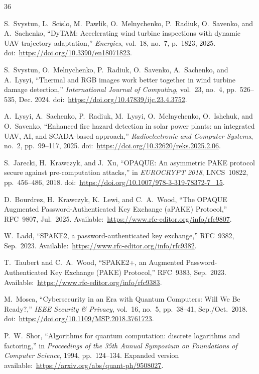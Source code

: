 \documentclass[conference]{IEEEtran}
\begin{document}
\begin{thebibliography}{36}

S.~Svystun, L.~Scislo, M.~Pawlik, O.~Melnychenko, P.~Radiuk, O.~Savenko, and A.~Sachenko, ``DyTAM: Accelerating wind turbine inspections with dynamic UAV trajectory adaptation,'' \emph{Energies}, vol.~18, no.~7, p.~1823, 2025. doi:~\url{https://doi.org/10.3390/en18071823}.

S.~Svystun, O.~Melnychenko, P.~Radiuk, O.~Savenko, A.~Sachenko, and A.~Lysyi, ``Thermal and RGB images work better together in wind turbine damage detection,'' \emph{International Journal of Computing}, vol.~23, no.~4, pp.~526--535, Dec. 2024. doi:~\url{https://doi.org/10.47839/ijc.23.4.3752}.

A.~Lysyi, A.~Sachenko, P.~Radiuk, M.~Lysyi, O.~Melnychenko, O.~Ishchuk, and O.~Savenko, ``Enhanced fire hazard detection in solar power plants: an integrated UAV, AI, and SCADA-based approach,'' \emph{Radioelectronic and Computer Systems}, no.~2, pp.~99--117, 2025. doi:~\url{https://doi.org/10.32620/reks.2025.2.06}.

S.~Jarecki, H.~Krawczyk, and J.~Xu, ``OPAQUE: An asymmetric PAKE protocol secure against pre-computation attacks,'' in \emph{EUROCRYPT 2018}, LNCS~10822, pp.~456--486, 2018. doi:~\url{https://doi.org/10.1007/978-3-319-78372-7_15}.

D.~Bourdrez, H.~Krawczyk, K.~Lewi, and C.~A.~Wood, ``The OPAQUE Augmented Password-Authenticated Key Exchange (aPAKE) Protocol,'' RFC~9807, Jul.~2025. Available:~\url{https://www.rfc-editor.org/info/rfc9807}.

W.~Ladd, ``SPAKE2, a password-authenticated key exchange,'' RFC~9382, Sep.~2023. Available:~\url{https://www.rfc-editor.org/info/rfc9382}.

T.~Taubert and C.~A.~Wood, ``SPAKE2+, an Augmented Password-Authenticated Key Exchange (PAKE) Protocol,'' RFC~9383, Sep.~2023. Available:~\url{https://www.rfc-editor.org/info/rfc9383}.

M.~Mosca, ``Cybersecurity in an Era with Quantum Computers: Will We Be Ready?,'' \emph{IEEE Security \& Privacy}, vol.~16, no.~5, pp.~38--41, Sep./Oct.~2018. doi:~\url{https://doi.org/10.1109/MSP.2018.3761723}.

P.~W.~Shor, ``Algorithms for quantum computation: discrete logarithms and factoring,'' in \emph{Proceedings of the 35th Annual Symposium on Foundations of Computer Science}, 1994, pp.~124--134. Expanded version available:~\url{https://arxiv.org/abs/quant-ph/9508027}.


\end{thebibliography}
\end{document}
